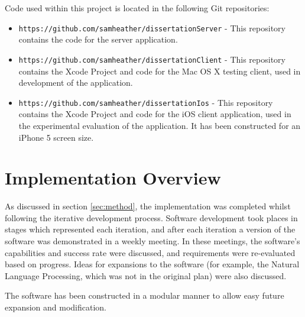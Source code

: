 \documentclass[authoryearcitations]{UoYCSproject}
\begin{document}
Code used within this project is located in the following Git repositories:
\begin{itemize}
  \item \texttt{https://github.com/samheather/dissertationServer} - This repository contains the code for the server application.
  \item \texttt{https://github.com/samheather/dissertationClient} - This repository contains the Xcode Project and code for the Mac OS X testing client, used in development of the application.
  \item \texttt{https://github.com/samheather/dissertationIos} - This repository contains the Xcode Project and code for the iOS client application, used in the experimental evaluation of the application. It has been constructed for an iPhone 5 screen size.
\end{itemize}

\section{Implementation Overview}
As discussed in section \ref{sec:method}, the implementation was completed whilst following the iterative development process. Software development took places in stages which represented each iteration, and after each iteration a version of the software was demonstrated in a weekly meeting. In these meetings, the software's capabilities and success rate were discussed, and requirements were re-evaluated based on progress. Ideas for expansions to the software (for example, the Natural Language Processing, which was not in the original plan) were also discussed.

The software has been constructed in a modular manner to allow easy future expansion and modification.
\end{document}
